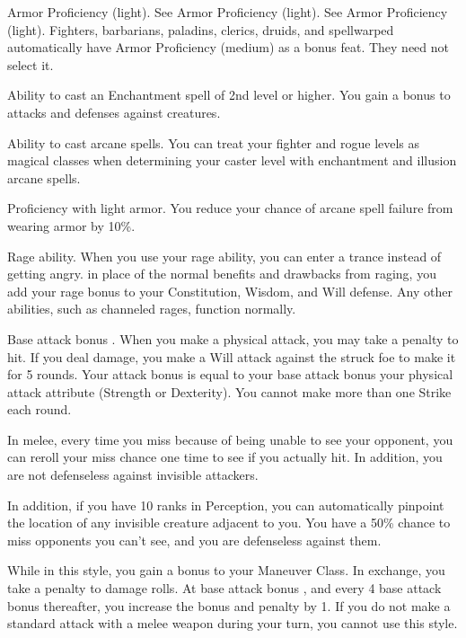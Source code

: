  Armor Proficiency (light).
 See Armor Proficiency (light).
 See Armor Proficiency (light).
 Fighters, barbarians, paladins, clerics, druids, and spellwarped automatically have Armor Proficiency (medium) as a bonus feat. They need not select it.

\featpre Ability to cast an Enchantment spell of 2nd level or higher.
\featben You gain a  bonus to attacks and defenses against \bewildered creatures.
\featspecial \featbanenotes

\featpre Ability to cast arcane spells.
\featben You can treat your fighter and rogue levels as magical classes when determining your caster level with enchantment and illusion arcane spells.

\featpre Proficiency with light armor.
\featben You reduce your chance of arcane spell failure from wearing armor by 10\%.

\featpre Rage ability.
\featben When you use your rage ability, you can enter a trance instead of getting angry. in place of the normal benefits and drawbacks from raging, you add your rage bonus to your Constitution, Wisdom, and Will defense. Any other abilities, such as channeled rages, function normally.

\featpre Base attack bonus .
\featben When you make a physical attack, you may take a  penalty to hit. If you deal damage, you make a Will attack against the struck foe to make it \bewildered for 5 rounds. Your attack bonus is equal to your base attack bonus \add your physical attack attribute (Strength or Dexterity). You cannot make more than one Strike each round.

 In melee, every time you miss because of being unable to see your opponent, you can reroll your miss chance one time to see if you actually hit. In addition, you are not defenseless against invisible attackers.
\par In addition, if you have 10 ranks in Perception, you can automatically pinpoint the location of any invisible creature adjacent to you.
 You have a 50\% chance to miss opponents you can't see, and you are defenseless against them.

 While in this style, you gain a  bonus to your Maneuver Class. In exchange, you take a  penalty to damage rolls. At base attack bonus , and every 4 base attack bonus thereafter, you increase the bonus and penalty by 1. If you do not make a standard attack with a melee weapon during your turn, you cannot use this style.


